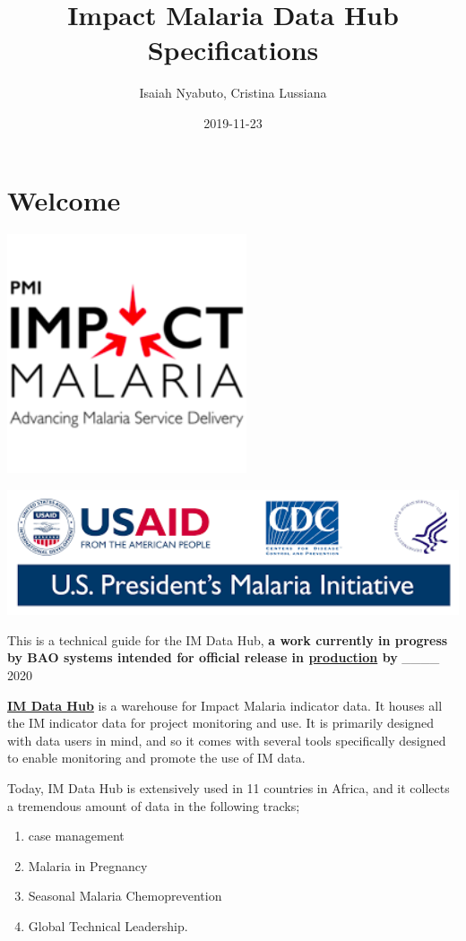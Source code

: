 \documentclass[]{book}
\title{Impact Malaria Data Hub Specifications}
\author{Isaiah Nyabuto, Cristina Lussiana}
\date{2019-11-23}
\providecommand{\tightlist}{%
  \setlength{\itemsep}{0pt}\setlength{\parskip}{0pt}}
\begin{document}
\maketitle

{
\setcounter{tocdepth}{1}
\tableofcontents
}
\hypertarget{welcome}{%
\chapter*{Welcome}\label{welcome}}

\includegraphics[width=2.78in]{./images/logo1}

\includegraphics[width=5.93in]{./images/logo2}

This is a technical guide for the IM Data Hub, \textbf{a work currently in progress by BAO systems intended for official release in \href{imdatahub.org}{production} by }\_\_\_\_ 2020

\href{imdatahub.org}{\textbf{IM Data Hub}} is a warehouse for Impact Malaria indicator data. It houses all the IM indicator data for project monitoring and use. It is primarily designed with data users in mind, and so it comes with several tools specifically designed to enable monitoring and promote the use of IM data.

Today, IM Data Hub is extensively used in 11 countries in Africa, and it collects a tremendous amount of data in the following tracks;

\begin{enumerate}
\def\labelenumi{\arabic{enumi}.}
\tightlist
\item
  case management
\item
  Malaria in Pregnancy
\item
  Seasonal Malaria Chemoprevention
\item
  Global Technical Leadership.
\end{enumerate}
\end{document}
